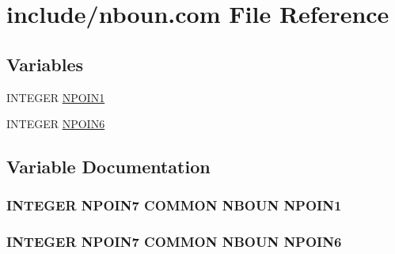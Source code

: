 \hypertarget{home_2abonfi_2_c_f_d__codes_2_eul_f_s_83_84_2include_2nboun_8com}{\section{include/nboun.com File Reference}
\label{home_2abonfi_2_c_f_d__codes_2_eul_f_s_83_84_2include_2nboun_8com}
}
\subsection*{Variables}
\begin{DoxyCompactItemize}
\item 
I\-N\-T\-E\-G\-E\-R \hyperlink{home_2abonfi_2_c_f_d__codes_2_eul_f_s_83_84_2include_2nboun_8com_a16b7b164151edb849dfc519b81b22952}{N\-P\-O\-I\-N1}
\item 
I\-N\-T\-E\-G\-E\-R \hyperlink{home_2abonfi_2_c_f_d__codes_2_eul_f_s_83_84_2include_2nboun_8com_ad5396b70ef7b4f2b539b154ba13a65bf}{N\-P\-O\-I\-N6}
\end{DoxyCompactItemize}


\subsection{Variable Documentation}
\hypertarget{home_2abonfi_2_c_f_d__codes_2_eul_f_s_83_84_2include_2nboun_8com_a16b7b164151edb849dfc519b81b22952}{
\subsubsection[{N\-P\-O\-I\-N1}]{\setlength{\rightskip}{0pt plus 5cm}I\-N\-T\-E\-G\-E\-R N\-P\-O\-I\-N7 C\-O\-M\-M\-O\-N N\-B\-O\-U\-N N\-P\-O\-I\-N1}}\label{home_2abonfi_2_c_f_d__codes_2_eul_f_s_83_84_2include_2nboun_8com_a16b7b164151edb849dfc519b81b22952}
\hypertarget{home_2abonfi_2_c_f_d__codes_2_eul_f_s_83_84_2include_2nboun_8com_ad5396b70ef7b4f2b539b154ba13a65bf}{
\subsubsection[{N\-P\-O\-I\-N6}]{\setlength{\rightskip}{0pt plus 5cm}I\-N\-T\-E\-G\-E\-R N\-P\-O\-I\-N7 C\-O\-M\-M\-O\-N N\-B\-O\-U\-N N\-P\-O\-I\-N6}}\label{home_2abonfi_2_c_f_d__codes_2_eul_f_s_83_84_2include_2nboun_8com_ad5396b70ef7b4f2b539b154ba13a65bf}
